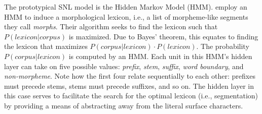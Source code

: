 {%
The prototypical SNL model is the Hidden Markov Model (HMM). 
\cite{creutz-and-lagus:2005, creutz-and-lagus:2007} employ an HMM to induce a morphological lexicon, i.e., a list of morpheme-like segments they call \textit{morphs}. 
Their algorithm seeks to find the lexicon such that $P(lexicon|corpus)$ is maximized. Due to Bayes' theorem, this equates to finding the lexicon that maximizes $P(corpus|lexicon) \cdot P(lexicon)$. The probability $P(corpus|lexicon)$ is computed by an HMM. Each unit in this HMM's hidden layer can take on five possible values: \textit{prefix}, \textit{stem}, \textit{suffix}, \textit{word boundary}, and \textit{non-morpheme}. 
Note how the first four relate sequentially to each other: prefixes must precede stems, stems must precede suffixes, and so on.
The hidden layer in this case serves to facilitate the search for the optimal lexicon 
(i.e., segmentation) by providing a means of abstracting away from the literal surface characters.

 \begin{figure}[tb]
 \begin{center}
\end{center}
\end{figure}}
